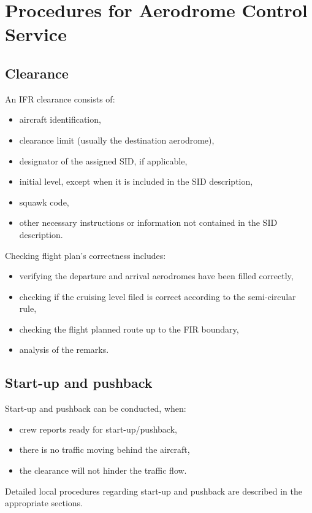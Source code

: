 \chapter{Procedures for Aerodrome Control Service}\label{ch:twr:proc}

\section{Clearance}

An IFR clearance consists of:
\begin{itemize}
	\item aircraft identification,
	\item clearance limit (usually the destination aerodrome),
	\item designator of the assigned SID, if applicable,
	\item initial level, except when it is included in the SID description,
	\item squawk code,
	\item other necessary instructions or information not contained in the SID description.
\end{itemize}

Checking flight plan's correctness includes:
\begin{itemize}
	\item verifying the departure and arrival aerodromes have been filled correctly,
	\item checking if the cruising level filed is correct according to the semi-circular rule,
	\item checking the flight planned route up to the FIR boundary,
	\item analysis of the remarks.
\end{itemize}

\section{Start-up and pushback}

Start-up and pushback can be conducted, when:
\begin{itemize}
	\item crew reports ready for start-up/pushback,
	\item there is no traffic moving behind the aircraft,
	\item the clearance will not hinder the traffic flow.
\end{itemize}

Detailed local procedures regarding start-up and pushback are described in the appropriate sections.

